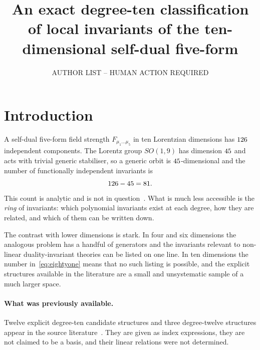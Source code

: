 \documentclass[11pt,a4paper]{article}
\title{An exact degree-ten classification of local invariants of the
       ten-dimensional self-dual five-form}
\author[a]{AUTHOR LIST -- HUMAN ACTION REQUIRED}
\affiliation[a]{AFFILIATIONS -- HUMAN ACTION REQUIRED}
\begin{document}
\maketitle

\begin{center}
\end{center}

\section{Introduction}
\label{sec:intro}

A self-dual five-form field strength $F_{\mu_1\ldots\mu_5}$ in ten Lorentzian
dimensions has $126$ independent components. The Lorentz group
$SO(1,9)$ has dimension $45$ and acts with trivial generic
stabiliser, so a generic orbit is $45$-dimensional and the number
of functionally independent invariants is~\cite{Hutomo:2025chiral}
\begin{equation}
  126 - 45 = 81 .
  \label{eq:eightyone}
\end{equation}
This count is analytic and is not in question~\cite{Hutomo:2025chiral}. What is much less accessible is
the \emph{ring} of invariants: which polynomial invariants exist at each degree,
how they are related, and which of them can be written down.

The contrast with lower dimensions is stark. In four and six dimensions the
analogous problem has a handful of generators and the invariants relevant to
non-linear duality-invariant theories can be listed on one line. In ten
dimensions the number in~\eqref{eq:eightyone} means that no such listing is
possible, and the explicit structures available in the literature are a small
and unsystematic sample of a much larger space.

\paragraph{What was previously available.} Twelve explicit degree-ten
candidate structures and three degree-twelve structures appear in the source
literature~\cite{Cederwall:2025invariants}. They are given as index expressions, they are not claimed to be a
basis, and their linear relations were not determined.
\end{document}
